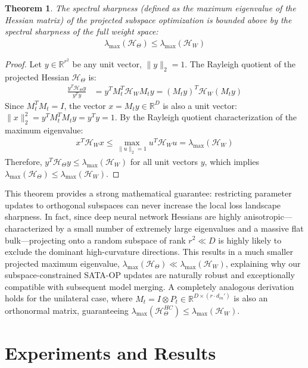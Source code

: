 \documentclass{article}
\theoremstyle{plain}
\newtheorem{theorem}{Theorem}[section]
\theoremstyle{definition}
\theoremstyle{remark}
\begin{document}
\begin{theorem}
The spectral sharpness (defined as the maximum eigenvalue of the Hessian matrix) of the projected subspace optimization is bounded above by the spectral sharpness of the full weight space:
\begin{align}
    \lambda_{\max}(\mathcal{H}_{\Theta}) \le \lambda_{\max}(\mathcal{H}_W)
\end{align}
\end{theorem}
\begin{proof}
Let $y \in \mathbb{R}^{r^2}$ be any unit vector, $\|y\|_2 = 1$. The Rayleigh quotient of the projected Hessian $\mathcal{H}_{\Theta}$ is:
\begin{align*}
    \frac{y^T \mathcal{H}_{\Theta} y}{y^T y} &= y^T M_t^T \mathcal{H}_W M_t y = (M_t y)^T \mathcal{H}_W (M_t y)
\end{align*}
Since $M_t^T M_t = I$, the vector $x = M_t y \in \mathbb{R}^D$ is also a unit vector: $\|x\|_2^2 = y^T M_t^T M_t y = y^T y = 1$. By the Rayleigh quotient characterization of the maximum eigenvalue:
\begin{align*}
    x^T \mathcal{H}_W x \le \max_{\|u\|_2 = 1} u^T \mathcal{H}_W u = \lambda_{\max}(\mathcal{H}_W)
\end{align*}
Therefore, $y^T \mathcal{H}_{\Theta} y \le \lambda_{\max}(\mathcal{H}_W)$ for all unit vectors $y$, which implies $\lambda_{\max}(\mathcal{H}_{\Theta}) \le \lambda_{\max}(\mathcal{H}_W)$.
\end{proof}

This theorem provides a strong mathematical guarantee: restricting parameter updates to orthogonal subspaces can never increase the local loss landscape sharpness. In fact, since deep neural network Hessians are highly anisotropic---characterized by a small number of extremely large eigenvalues and a massive flat bulk---projecting onto a random subspace of rank $r^2 \ll D$ is highly likely to exclude the dominant high-curvature directions. This results in a much smaller projected maximum eigenvalue, $\lambda_{\max}(\mathcal{H}_{\Theta}) \ll \lambda_{\max}(\mathcal{H}_W)$, explaining why our subspace-constrained SATA-OP updates are naturally robust and exceptionally compatible with subsequent model merging. A completely analogous derivation holds for the unilateral case, where $M_t = I \otimes P_t \in \mathbb{R}^{D \times (r \cdot d_{in}')}$ is also an orthonormal matrix, guaranteeing $\lambda_{\max}(\mathcal{H}_{\Theta}^{HC}) \le \lambda_{\max}(\mathcal{H}_W)$.

\section{Experiments and Results}
\label{sec:experiments}
\end{document}
